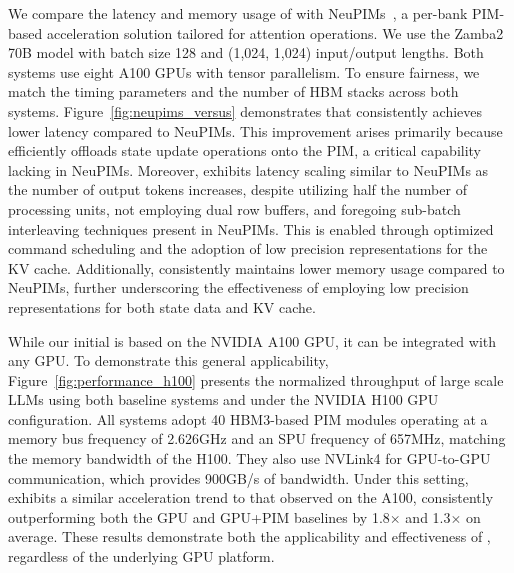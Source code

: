 %
%
We compare the latency and memory usage of \sysname{} with
NeuPIMs~\cite{heo2024neupims}, a per-bank PIM-based acceleration
solution tailored for attention operations.
%
We use the Zamba2 70B model with batch size 128 and (1,024, 1,024)
input/output lengths.
%
Both systems use eight A100 GPUs with tensor parallelism.
%
To ensure fairness, we match the timing parameters and the number of
HBM stacks across both systems.
%
Figure~\ref{fig:neupims_versus} demonstrates that \sysname{}
consistently achieves lower latency compared to NeuPIMs.
%
This improvement arises primarily because \sysname{} efficiently
offloads state update operations onto the PIM, a critical capability
lacking in NeuPIMs.
%
Moreover, \sysname{} exhibits latency scaling similar to NeuPIMs as the
number of output tokens increases, despite utilizing half the number
of processing units, not employing dual row buffers, and foregoing
sub-batch interleaving techniques present in NeuPIMs.
%
This is enabled through optimized command scheduling and the adoption
of low precision representations for the KV cache.
%
Additionally, \sysname{} consistently maintains lower memory usage
compared to NeuPIMs, further underscoring the effectiveness of
employing low precision representations for both state data and KV cache.
%

%
%
While our initial \sysname{} is based on the NVIDIA A100 GPU, it can
be integrated with any GPU.
%
To demonstrate this general applicability,
Figure~\ref{fig:performance_h100} presents the normalized
throughput of large scale LLMs using both baseline systems and
\sysname{} under the NVIDIA H100 GPU configuration.
%
All systems adopt 40 HBM3-based PIM modules operating at a memory
bus frequency of 2.626GHz and an SPU frequency of 657MHz, matching
the memory bandwidth of the H100.
%
They also use NVLink4 for GPU-to-GPU communication, which provides
900GB/s of bandwidth.
%
Under this setting, \sysname{} exhibits a similar acceleration trend
to that observed on the A100, consistently outperforming both the
GPU and GPU+PIM baselines by 1.8$\times$ and 1.3$\times$ on average.
%
These results demonstrate both the applicability and effectiveness
of \sysname{}, regardless of the underlying GPU platform.

